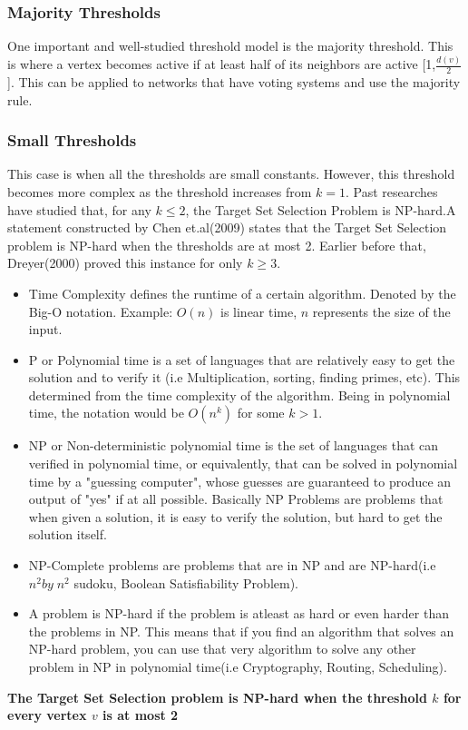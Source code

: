 \subsubsection{Majority Thresholds}
One important and well-studied threshold model is the majority threshold. This is where a vertex becomes active if at least half of its neighbors are active [1,$\frac{d(v)}{2}$].\cite{chen} This can be applied to networks that have voting systems and use the majority rule.
\subsubsection{Small Thresholds}
This case is when all the thresholds are small constants. However, this threshold becomes more complex as the threshold increases from $k=1$. Past researches have studied that, for any $k \leq 2$, the Target Set Selection Problem is NP-hard.A statement constructed by Chen et.al(2009) states that the Target Set Selection problem is NP-hard when the thresholds are at most 2. Earlier before that, Dreyer(2000) proved this instance for only $k \geq 3$.\cite{dreyer} \cite{NPhardness} 
\begin{itemize}
	\item Time Complexity defines the runtime of a certain algorithm. Denoted by the Big-O notation. Example: $O(n)$ is linear time, $n$ represents the size of the input.
	\item P or Polynomial time is a set of languages that are relatively easy to get the solution and to verify it (i.e Multiplication, sorting, finding primes, etc). This determined from the time complexity of the algorithm. Being in polynomial time, the notation would be $O(n^k)$ for some $k>1$.
	\item NP or Non-deterministic polynomial time is the set of languages that can verified in polynomial time, or equivalently, that can be solved in polynomial time by a "guessing computer", whose guesses are guaranteed to produce an output of "yes" if at all possible. Basically NP Problems are problems that when given a solution, it is easy to verify the solution, but hard to get the solution itself.
	\item NP-Complete problems are problems that are in NP and are NP-hard(i.e $n^{2}by\; n^{2}$ sudoku, Boolean Satisfiability Problem). 
	\item A problem is NP-hard if the problem is atleast as hard or even harder than the problems in NP. This means that if you find an algorithm that solves an NP-hard problem, you can use that very algorithm to solve any other problem in NP in polynomial time(i.e Cryptography, Routing, Scheduling).  
\end{itemize} 
\textbf{The Target Set Selection problem is NP-hard when the threshold $k$ for every vertex $v$ is at most 2}


